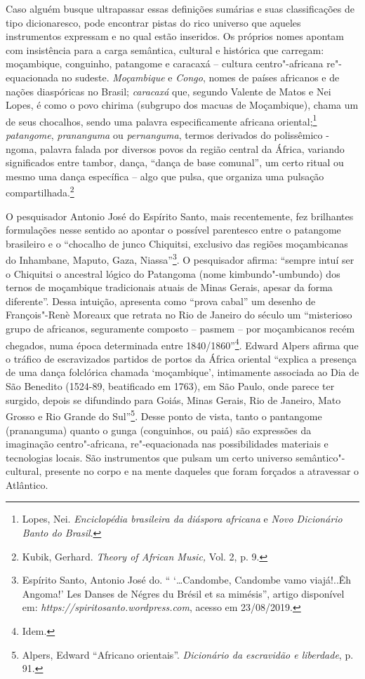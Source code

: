 Caso alguém busque ultrapassar essas definições sumárias e suas
classificações de tipo dicionaresco, pode encontrar pistas do rico
universo que aqueles instrumentos expressam e no qual estão inseridos.
Os próprios nomes apontam com insistência para a carga semântica,
cultural e histórica que carregam: moçambique, conguinho, patangome e
caracaxá -- cultura centro"-africana re"-equacionada no sudeste.
\emph{Moçambique} e \emph{Congo}, nomes de países africanos e de nações
diaspóricas no Brasil; \emph{caracaxá} que, segundo Valente de Matos e
Nei Lopes, é como o povo chirima (subgrupo dos macuas de Moçambique),
chama um de seus chocalhos, sendo uma palavra especificamente africana
oriental;\footnote{Lopes, Nei. \emph{Enciclopédia brasileira da diáspora
  africana} e \emph{Novo Dicionário Banto do Brasil}.} \emph{patangome},
\emph{prananguma} ou \emph{pernanguma}, termos derivados do polissêmico
-ngoma, palavra falada por diversos povos da região central da África,
variando significados entre tambor, dança, ``dança de base comunal'', um
certo ritual ou mesmo uma dança específica -- algo que pulsa, que
organiza uma pulsação compartilhada.\footnote{Kubik, Gerhard.
  \emph{Theory of African Music,} Vol. 2, p. 9.}

O pesquisador Antonio José do Espírito Santo, mais recentemente, fez
brilhantes formulações nesse sentido ao apontar o possível parentesco
entre o patangome brasileiro e o ``chocalho de junco Chiquitsi,
exclusivo das regiões moçambicanas do Inhambane, Maputo, Gaza,
Niassa''\footnote{Espírito Santo, Antonio José do. `` `\ldots{}Candombe,
  Candombe vamo viajá!..Êh Angoma!' Les Danses de Négres du Brésil et sa
  mimésis'', artigo disponível em:
  \emph{https://spiritosanto.wordpress.com},
  acesso em 23/08/2019.}. O pesquisador afirma: ``sempre intuí ser o
Chiquitsi o ancestral lógico do Patangoma (nome kimbundo"-umbundo) dos
ternos de moçambique tradicionais atuais de Minas Gerais, apesar da
forma diferente''. Dessa intuição, apresenta como ``prova cabal'' um
desenho de François"-Renè Moreaux que retrata no Rio de Janeiro do século
 um ``misterioso grupo de africanos, seguramente composto -- pasmem
-- por moçambicanos recém chegados, numa época determinada entre
1840/1860''\footnote{Idem.}. Edward Alpers afirma que o tráfico de
escravizados partidos de portos da África oriental ``explica a presença
de uma dança folclórica chamada `moçambique', intimamente associada ao
Dia de São Benedito (1524-89, beatificado em 1763), em São Paulo, onde
parece ter surgido, depois se difundindo para Goiás, Minas Gerais, Rio
de Janeiro, Mato Grosso e Rio Grande do Sul''\footnote{Alpers, Edward
  ``Africano orientais''. \emph{Dicionário da escravidão e liberdade},
  p. 91.}. Desse ponto de vista, tanto o pantangome (prananguma) quanto
o gunga (conguinhos, ou paiá) são expressões da imaginação
centro"-africana, re"-equacionada nas possibilidades materiais e
tecnologias locais. São instrumentos que pulsam um certo universo
semântico"-cultural, presente no corpo e na mente daqueles que foram
forçados a atravessar o Atlântico.

